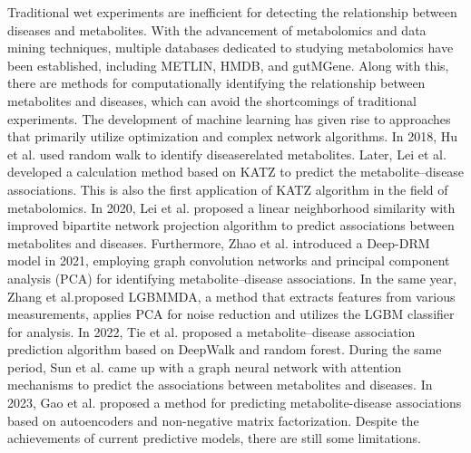 \documentclass[a4paper,fleqn]{cas-dc}
\begin{document}
Traditional wet experiments are inefficient for detecting the relationship between diseases and metabolites. With the advancement of metabolomics and data mining techniques, multiple databases dedicated to studying metabolomics have been established, including METLIN\cite{montenegro2020metlin}, HMDB\cite{wishart2022hmdb}, and gutMGene\cite{cheng2022gutmgene}. Along with this, there are methods for computationally identifying the relationship between metabolites and diseases, which can avoid the shortcomings of traditional experiments. The development of machine learning has given rise to approaches that primarily utilize optimization and complex network algorithms.
In 2018, Hu et al. used random walk to identify diseaserelated metabolites\cite{hu2018identifying}. Later, Lei et al. developed a calculation method based on KATZ to predict the metabolite–disease associations\cite{lei2019predicting}. This is also the first application of KATZ algorithm in the field of metabolomics. In 2020, Lei et al. proposed a linear neighborhood similarity with improved bipartite network projection algorithm to predict associations between metabolites and diseases\cite{lei2020predicting}. Furthermore, Zhao et al. introduced a Deep-DRM model in 2021\cite{zhao2021deep}, employing graph convolution networks and principal component analysis (PCA) for identifying metabolite–disease associations. In the same year, Zhang et al.proposed LGBMMDA\cite{zhang2021predicting}, a method that extracts features from various measurements, applies PCA for noise reduction and utilizes the LGBM classifier for analysis. In 2022, Tie et al. proposed a metabolite–disease association prediction algorithm based on DeepWalk and random forest\cite{tie2021metabolite}. During the same period, Sun et al. came up with a graph neural network with attention mechanisms to predict the associations between metabolites and diseases\cite{sun2022deep}. In 2023, Gao et al. proposed a method for predicting metabolite-disease associations based on autoencoders and non-negative matrix factorization\cite{gao2023predicting}. Despite the achievements of current predictive models, there are still some limitations.
\end{document}
